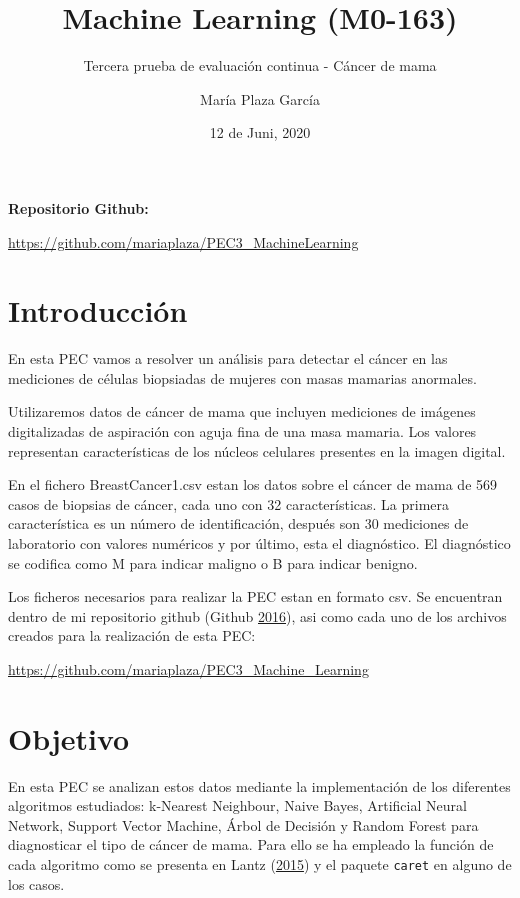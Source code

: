 \documentclass[
]{article}
\title{Machine Learning (M0-163)}
\subtitle{Tercera prueba de evaluación continua - Cáncer de mama}
\author{María Plaza García}
\date{12 de Juni, 2020}
\begin{document}
\maketitle

{
\hypersetup{linkcolor=}
\setcounter{tocdepth}{3}
\tableofcontents
}
\textbf{Repositorio Github:}

\url{https://github.com/mariaplaza/PEC3_MachineLearning}

\pagebreak

\hypertarget{introducciuxf3n}{%
\section{Introducción}\label{introducciuxf3n}}

En esta PEC vamos a resolver un análisis para detectar el cáncer en las
mediciones de células biopsiadas de mujeres con masas mamarias
anormales.

Utilizaremos datos de cáncer de mama que incluyen mediciones de imágenes
digitalizadas de aspiración con aguja fina de una masa mamaria. Los
valores representan características de los núcleos celulares presentes
en la imagen digital.

En el fichero BreastCancer1.csv estan los datos sobre el cáncer de mama
de 569 casos de biopsias de cáncer, cada uno con 32 características. La
primera característica es un número de identificación, después son 30
mediciones de laboratorio con valores numéricos y por último, esta el
diagnóstico. El diagnóstico se codifica como M para indicar maligno o B
para indicar benigno.

Los ficheros necesarios para realizar la PEC estan en formato csv. Se
encuentran dentro de mi repositorio github (Github
\protect\hyperlink{ref-github2016github}{2016}), asi como cada uno de
los archivos creados para la realización de esta PEC:

\url{https://github.com/mariaplaza/PEC3_Machine_Learning}

\hypertarget{objetivo}{%
\section{Objetivo}\label{objetivo}}

En esta PEC se analizan estos datos mediante la implementación de los
diferentes algoritmos estudiados: k-Nearest Neighbour, Naive Bayes,
Artificial Neural Network, Support Vector Machine, Árbol de Decisión y
Random Forest para diagnosticar el tipo de cáncer de mama. Para ello se
ha empleado la función de cada algoritmo como se presenta en Lantz
(\protect\hyperlink{ref-lantz2015machine}{2015}) y el paquete
\texttt{caret} en alguno de los casos.
\end{document}
